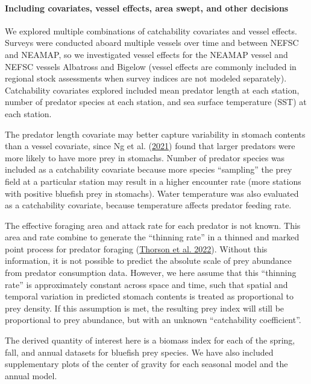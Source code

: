 \documentclass[
]{article}
\begin{document}
\hypertarget{including-covariates-vessel-effects-area-swept-and-other-decisions}{%
\paragraph{Including covariates, vessel effects, area swept, and other decisions}\label{including-covariates-vessel-effects-area-swept-and-other-decisions}}

We explored multiple combinations of catchability covariates and vessel effects. Surveys were conducted aboard multiple vessels over time and between NEFSC and NEAMAP, so we investigated vessel effects for the NEAMAP vessel and NEFSC vessels Albatross and Bigelow (vessel effects are commonly included in regional stock assessments when survey indices are not modeled separately). Catchability covariates explored included mean predator length at each station, number of predator species at each station, and sea surface temperature (SST) at each station.

The predator length covariate may better capture variability in stomach contents than a vessel covariate, since Ng et al. (\protect\hyperlink{ref-ng_predator_2021}{2021}) found that larger predators were more likely to have more prey in stomachs. Number of predator species was included as a catchability covariate because more species ``sampling'' the prey field at a particular station may result in a higher encounter rate (more stations with positive bluefish prey in stomachs). Water temperature was also evaluated as a catchability covariate, because temperature affects predator feeding rate.

The effective foraging area and attack rate for each predator is not known. This area and rate combine to generate the ``thinning rate'' in a thinned and marked point process for predator foraging (\protect\hyperlink{ref-thorson_diet_2022}{Thorson et al. 2022}). Without this information, it is not possible to predict the absolute scale of prey abundance from predator consumption data. However, we here assume that this ``thinning rate'' is approximately constant across space and time, such that spatial and temporal variation in predicted stomach contents is treated as proportional to prey density. If this assumption is met, the resulting prey index will still be proportional to prey abundance, but with an unknown ``catchability coefficient''.

The derived quantity of interest here is a biomass index for each of the spring, fall, and annual datasets for bluefish prey species. We have also included supplementary plots of the center of gravity for each seasonal model and the annual model.
\end{document}
